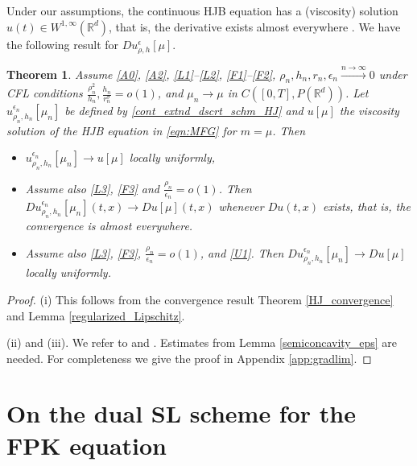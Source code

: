 \documentclass[a4paper,  twoside, 10pt, leqno]{amsart}
\newcommand{\rd}{\mathbb{R}^d}
\newtheorem{thm}{Theorem}[section]
\theoremstyle{remark}
\theoremstyle{definition}
\begin{document}
Under our assumptions, the continuous HJB equation
has a (viscosity) solution  $u ( t ) \in W^{1,\infty} ( \mathbb{R}^d )$, 
that is, the derivative exists almost everywhere \cite[Theorem 4.3]{ersland2020classical}. 
We have the following result for $Du_{\rho,h}^{\epsilon} [ \mu ]$.

\begin{thm} \label{thm:HJB-convergence-smoothsol}
    Assume \ref{A0}, \ref{A2}, \ref{L1}--\ref{L2}, \ref{F1}--\ref{F2},  $\rho_{n},h_{n}, r_{n}, \epsilon_n \xrightarrow{n \to \infty} 0$  under CFL conditions
    $\frac{\rho_{n}^{2}}{h_{n}} ,\frac{h_{n}}{r_{n}^{\sigma}} = o ( 1 )$, 
    and $\mu_n\rightarrow \mu$ in $C([0,T],P(\rd))$.
Let $u_{\rho_{n},h_{n}}^{\epsilon_n}[\mu_n]$ be defined by 
    \eqref{cont_extnd_dscrt_schm_HJ} and $u[\mu]$ the viscosity solution of the HJB equation in \eqref{eqn:MFG} for $m=\mu$. Then 
    
    \begin{itemize}
    \item[(i)]   $u_{\rho_{n}, h_{n}}^{\epsilon_{n}} [ \mu_{n} ] \rightarrow u [ \mu ]$
        locally uniformly,
    \item[(ii)] Assume also \ref{L3}, \ref{F3} and $\frac{\rho_n}{\epsilon_n}=o(1)$.  Then 
        $Du_{\rho_{n}, h_{n}}^{\epsilon_{n}} [ \mu_{n} ] ( t,x ) \rightarrow Du [ \mu ] ( t,x )$ whenever $Du ( t,x )$ exists, that is, the convergence is almost everywhere. 
    
    \item[(iii)] Assume also \ref{L3}, \ref{F3}, $\frac{\rho_n}{\epsilon_n}=o(1)$,  and  \ref{U1}. Then  $Du_{\rho_{n}, h_{n}}^{\epsilon_{n}} [ \mu_{n} ] \rightarrow Du [ \mu ]$ locally uniformly.
    \end{itemize}   
\end{thm}

\begin{proof}
    (i) This follows from the convergence result Theorem \ref{HJ_convergence} and Lemma \ref{regularized_Lipschitz}.   

    \noindent (ii) and (iii). We refer to \cite[Theorem $3.5$]{carliniSilva2014semi1st} and \cite[Proposition $5.1$]{MR3828859}. Estimates from Lemma \ref{semiconcavity_eps} are needed. For completeness we give the proof in Appendix \ref{app:gradlim}.
\end{proof}



\section{On the dual SL scheme for the FPK equation}\label{sec:FPK}
\end{document}
